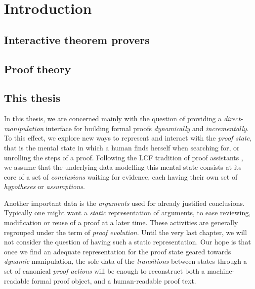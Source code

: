 \setchapterpreamble[u]{\margintoc}
\chapter{Introduction}

\section{Interactive theorem provers}


\section{Proof theory}

\section{This thesis}

In this thesis, we are concerned mainly with the question of providing a
\emph{direct-manipulation} interface for building formal proofs
\emph{dynamically} and \emph{incrementally}. To this effect, we explore new ways
to represent and interact with the \emph{proof state}, that is the mental state
in which a human finds herself when searching for, or unrolling the steps of a
proof. Following the LCF tradition of proof assistants
\cite{doi:10.1098/rsta.1984.0067}, we assume that the underlying data modelling
this mental state consists at its core of a set of \emph{conclusions} waiting
for evidence, each having their own set of \emph{hypotheses} or
\emph{assumptions}.

Another important data is the \emph{arguments} used for already justified
conclusions. Typically one might want a \emph{static} representation of
arguments, to ease reviewing, modification or reuse of a proof at a later time.
These activities are generally regrouped under the term of \emph{proof
evolution}. Until the very last chapter, we will not consider the question of
having such a static representation. Our hope is that once we find an adequate
representation for the proof state geared towards \emph{dynamic} manipulation,
the sole data of the \emph{transitions} between states through a set of
canonical \emph{proof actions} will be enough to reconstruct both a
machine-readable formal proof object, and a human-readable proof text.


